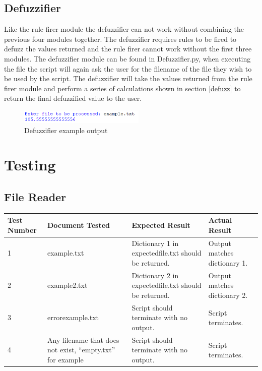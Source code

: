\documentclass{article}
\begin{document}
\subsection{Defuzzifier}
Like the rule firer module the defuzzifier can not work without combining the previous four modules together. The defuzzifier requires rules to be fired to defuzz the values returned and the rule firer cannot work without the first three modules. The defuzzifier module can be found in Defuzzifier.py, when executing the file the script will again ask the user for the filename of the file they wish to be used by the script. The defuzzifier will take the values returned from the rule firer module and perform a series of calculations shown  in section \ref{defuzz} to return the final defuzzified value to the user.

\begin{figure}[H]
\centering
\includegraphics[width=6cm]{example5}
\caption{Defuzzifier example output}
\end{figure}

\section{Testing}
\subsection{File Reader}
\begin{center}
 \begin{tabular}{ |p{2cm}|p{3cm}|p{3cm}|p{3cm}|  }
 \hline
 Test Number & Document Tested & Expected Result & Actual Result \\ [0.5ex] 
 \hline\hline
 1 & example.txt & Dictionary 1 in expectedfile.txt should be returned. & Output matches dictionary 1. \\ 
 \hline
 2 & example2.txt & Dictionary 2 in expectedfile.txt should be returned. & Output matches dictionary 2. \\
 \hline
 3 & errorexample.txt & Script should terminate with no output. & Script terminates. \\
 \hline
 4 & Any filename that does not exist, “empty.txt” for example & Script should terminate with no output. & Script terminates. \\
 \hline
\end{tabular}
\end{center}
\end{document}
